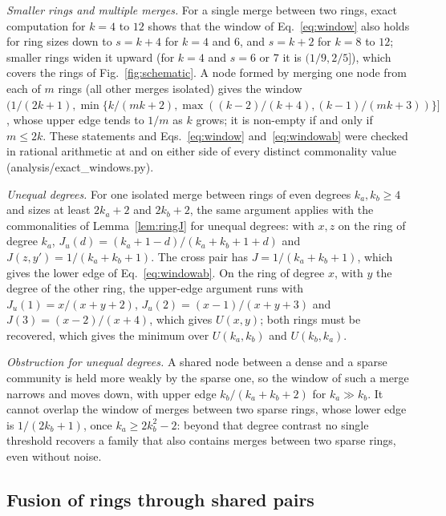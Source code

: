 \emph{Smaller rings and multiple merges.} For a single merge between two rings, exact
computation for $k=4$ to $12$ shows that the window of Eq.~\eqref{eq:window} also holds
for ring sizes down to $s=k+4$ for $k=4$ and $6$, and $s=k+2$ for $k=8$ to $12$; smaller
rings widen it upward (for $k=4$ and $s=6$ or $7$ it is $(1/9,2/5]$), which covers the
rings of Fig.~\ref{fig:schematic}. A node formed by merging one node from each of $m$
rings (all other merges isolated) gives the window
$(1/(2k+1),\min\{k/(mk+2),\max((k-2)/(k+4),(k-1)/(mk+3))\}]$, whose upper edge tends to
$1/m$ as $k$ grows; it is non-empty if and only if $m\le2k$. These statements and
Eqs.~\eqref{eq:window} and~\eqref{eq:windowab} were checked in rational arithmetic at
and on either side of every distinct commonality value (analysis/exact\_windows.py).

\emph{Unequal degrees.} For one isolated merge between rings of even degrees
$k_a,k_b\ge4$ and sizes at least $2k_a+2$ and $2k_b+2$, the same argument applies with
the commonalities of Lemma~\ref{lem:ringJ} for unequal degrees: with $x,z$ on the ring
of degree $k_a$, $J_u(d)=(k_a+1-d)/(k_a+k_b+1+d)$ and $J(z,y')=1/(k_a+k_b+1)$. The cross
pair has
$J=1/(k_a+k_b+1)$, which gives the lower edge of Eq.~\eqref{eq:windowab}. On the ring of
degree $x$, with $y$ the degree of the other ring, the upper-edge argument runs with
$J_u(1)=x/(x+y+2)$, $J_u(2)=(x-1)/(x+y+3)$ and $J(3)=(x-2)/(x+4)$, which gives
$U(x,y)$; both rings must be recovered, which gives the minimum over $U(k_a,k_b)$ and
$U(k_b,k_a)$.

\emph{Obstruction for unequal degrees.} A shared node between a dense and a sparse
community is held more weakly by the sparse one, so the window of such a merge narrows
and moves down, with upper edge $k_b/(k_a+k_b+2)$ for $k_a\gg k_b$. It cannot overlap
the window of merges between two sparse rings, whose lower edge is $1/(2k_b+1)$, once
$k_a\ge2k_b^2-2$: beyond that degree contrast no single threshold recovers a family that
also contains merges between two sparse rings, even without noise.
\subsection{Fusion of rings through shared pairs}

